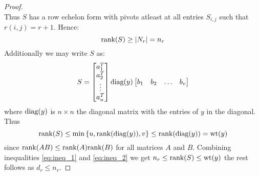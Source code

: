 \begin{proof}
\begin{equation*}
  \end{equation*}
  Thus $S$ has a row echelon form with pivots atleast at all entries $S_{i, j}$ such that $r(i, j) = r + 1$. Hence:
  \begin{equation}\label{eq:ineq_1}
    \textnormal{rank}(S) \geq \left\lvert N_r\right\rvert = n_r
  \end{equation}
  Additionally we may write $S$ as:
  \begin{equation*}
    S = \begin{bmatrix} a_1^T \\ a_2^T \\ \vdots \\ a_u^T \end{bmatrix} \textnormal{diag}(y) \begin{bmatrix} b_1 & b_2 & \ldots & b_{v} \end{bmatrix}
  \end{equation*}
  where $\textnormal{diag}(y)$ is $n \times n$ the diagonal matrix with the entries of $y$ in the diagonal.
  Thus
  \begin{equation}\label{eq:ineq_2}
  \textnormal{rank}(S) \leq \min \left\{u, \textnormal{rank}(\textnormal{diag}(y)), v\right\} \leq \textnormal{rank}(\textnormal{diag}(y)) = \mathrm{wt}(y)
  \end{equation}
  since $\textnormal{rank}(AB) \leq \textnormal{rank}(A)\textnormal{rank}(B)$ for all matrices $A$ and $B$. Combining inequalities \eqref{eq:ineq_1} and \eqref{eq:ineq_2} we get $n_r \leq \textnormal{rank}(S) \leq \mathrm{wt}(y)$ the rest follows as $d_r \leq n_{r}$.
\end{proof}

